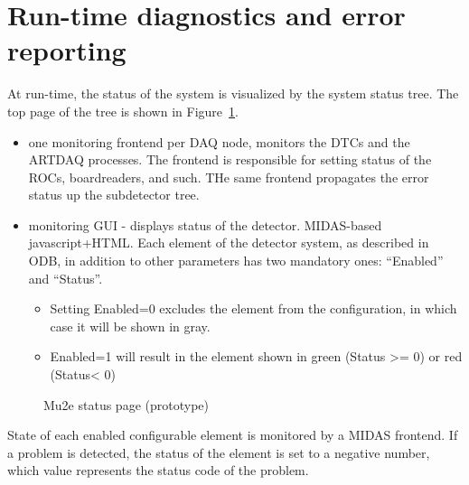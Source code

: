 \section{Run-time diagnostics and error reporting}

At run-time, the status of the system is visualized by the system status tree.
The top page of the tree is shown in Figure~\ref{figure:mu2e_status_page}.

\begin{itemize}
\item
  one monitoring frontend per DAQ node, monitors the DTCs and the ARTDAQ processes.
  The frontend is responsible for setting status of the ROCs, boardreaders, and such.
  THe same frontend propagates the error status up the subdetector tree. 
  \item
  monitoring GUI - displays status of the detector. MIDAS-based javascript+HTML.
  Each element of the detector system, as described in ODB, in addition to other parameters
  has two mandatory ones: ``Enabled'' and ``Status''.
  \begin{itemize}
  \item 
    Setting Enabled=0 excludes the element from the configuration, in which case it will be
    shown in gray.
  \item
    Enabled=1 will result in the element shown in green (Status >= 0) or red (Status< 0) 
  \end{itemize}
\end{itemize}

\begin{figure}[H]
  \caption{
    \label{figure:mu2e_status_page}
    Mu2e status page (prototype)
  }
\end{figure}

State of each enabled configurable element is monitored by a MIDAS frontend.
If a problem is detected, the status of the element is set to a negative
number, which value represents the status code of the problem.

